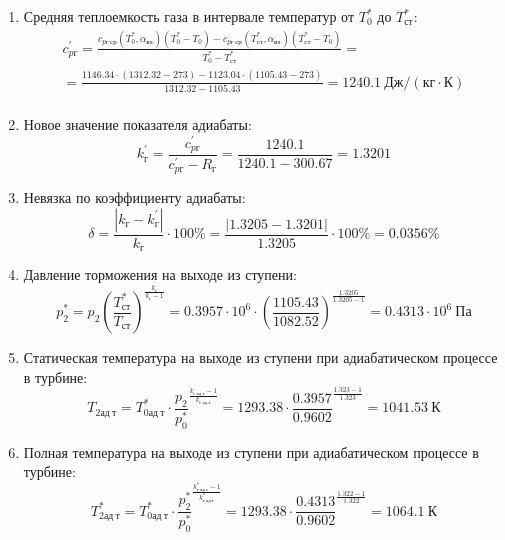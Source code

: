 \documentclass[a4paper,12pt]{article}
\begin{document}
\begin{enumerate}
        \item Средняя теплоемкость газа в интервале температур от $T_0^*$ до $T_{ст}^*$:
        \begin{gather*}
            c_{pг}^\prime = \frac{
		        c_{pг\ ср} (T_0^*, \alpha_{вх}) (T_0^* - T_0) - c_{pг\ ср} (T_{ст}^*, \alpha_{вх})(T_{ст}^* - T_0)
		    }{
		        T_0^* - T_{ст}^*} =\\
            =\frac{
		        1146.34 \cdot
                (1312.32 - 273) -
		        1123.04 \cdot
                (1105.43 - 273)
		    }{
		        1312.32 - 1105.43} =
		    1240.1 \ Дж / (кг \cdot К)\\
        \end{gather*}

        \item Новое значение показателя адиабаты:
        \[
            k_г^\prime = \frac{c_{pг}^\prime}{c_{pг}^\prime - R_г} =
                \frac{
                    1240.1
                }{
                    1240.1 - 300.67
                }
            = 1.3201
        \]

        \item Невязка по коэффициенту адиабаты:
        \[
            \delta = \frac{ \left| k_г - k_г^\prime \right| }{ k_г } \cdot 100 \%=
                \frac{
                    \left| 1.3205 - 1.3201 \right|
                }{
                    1.3205
                } \cdot 100 \% =
            0.0356 \%
        \]

        \item Давление торможения на выходе из ступени:
        \[
            p_2^* = p_2 \left(
                            \frac{ T_{ст}^* }{ T_{ст} }
                    \right) ^ \frac{ k_г }{ k_г - 1 } =
                 0.3957 \cdot 10^6 \cdot \left(
                            \frac{ 1105.43 }{ 1082.52 }
                    \right) ^
                \frac{ 1.3205 }{ 1.3205 - 1 } =
            0.4313 \cdot 10^6 \ Па
        \]

        \item Статическая температура на выходе из ступени при адиабатическом процессе в турбине:
        \[
            T_{2ад\ т} = T_{0ад\ т}^* \cdot \frac{p_2}{p_0^*} ^ {
                    \frac{k_{г\ ад\ т} - 1}{k_{г\ ад\ т} }
            } = 1293.38 \cdot
            \frac{ 0.3957
            }{
            0.9602
            } ^ {
                    \frac{1.323 - 1}{1.323}
            } =
            1041.53\ К
        \]

        \item Полная температура на выходе из ступени при адиабатическом процессе в турбине:
        \[
            T_{2ад\ т}^* = T_{0ад\ т}^* \cdot \frac{p_2^*}{p_0^*} ^ {
                    \frac{k_{г\ ад\ т}^* - 1}{k_{г\ ад\ т}^*}
            } = 1293.38 \cdot
            \frac{ 0.4313
            }{
            0.9602
            } ^ {
                    \frac{1.322 - 1}{1.322}
            } =
            1064.1\ К
        \]


\end{enumerate}
\end{document}

